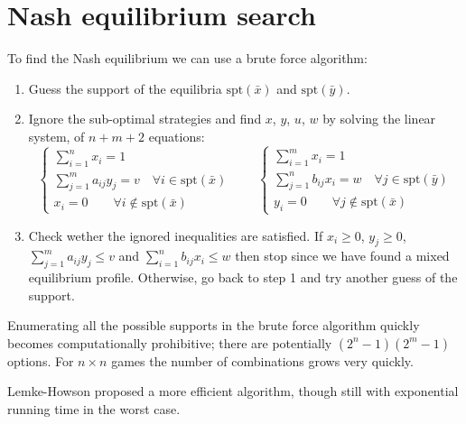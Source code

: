 \section{Nash equilibrium search}

To find the Nash equilibrium we can use a brute force algorithm: 
\begin{enumerate}
    \item Guess the support of the equilibria $\text{spt}(\bar{x})$ and $\text{spt}(\bar{y})$. 
    \item Ignore the sub-optimal strategies and find $x$, $y$, $u$, $w$ by solving the linear system, of $n+m+2$ equations: 
        \[\begin{cases}
            \sum_{i=1}^{n}x_i=1 \\
            \sum_{j=1}^{m}a_{ij}y_j=v\quad\forall i \in \text{spt}(\bar{x}) \\
            x_i=0 \quad \quad\forall i \notin \text{spt}(\bar{x})
        \end{cases} \qquad \begin{cases}
            \sum_{i=1}^{m}x_i=1 \\
            \sum_{j=1}^{n}b_{ij}x_i=w\quad\forall j \in \text{spt}(\bar{y}) \\
            y_i=0 \quad \quad\forall j \notin \text{spt}(\bar{x})
        \end{cases}\]
    \item Check wether the ignored inequalities are satisfied. 
        If $x_i\geq 0$, $y_j\geq 0$, $\sum_{j=1}^{m}a_{ij}y_j\leq v$ and $\sum_{i=1}^{n}b_{ij}x_i\leq w$ then stop since we have found a mixed equilibrium profile. 
        Otherwise, go back to step 1 and try another guess of the support. 
\end{enumerate}
\noindent Enumerating all the possible supports in the brute force algorithm quickly becomes computationally prohibitive; there are potentially $(2^n-1)(2^m-1)$ options. 
For $n\times n$ games the number of combinations grows very quickly. 

Lemke-Howson proposed a more efficient algorithm, though still with exponential running time in the worst case. 
